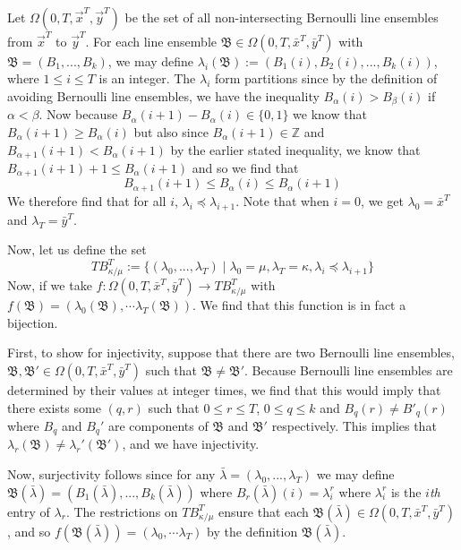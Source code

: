 \documentclass[12pt]{article}
\begin{document}
	Let $\Omega(0,T,\vec{x}^T, \vec{y}^T)$ be the set of all non-intersecting Bernoulli line ensembles from $\vec{x}^T$ to $\vec{y}^T$. For each line ensemble $\mathfrak{B}\in \Omega(0,T,\bar x^T,\bar y^T)$ with $\mathfrak B=(B_1,...,B_k)$, we may define $\lambda_i(\mathfrak B):=(B_1(i),B_2(i),...,B_k(i))$, where $1 \leqslant i\leqslant T$ is an integer. The $\lambda_i$ form partitions since by the definition of avoiding Bernoulli line ensembles, we have the inequality $B_\alpha(i)>B_\beta(i)$ if $\alpha<\beta$. 
Now because $B_\alpha(i+1)-B_\alpha(i)\in \{0,1\}$ we know that $B_\alpha(i+1)\geq B_\alpha(i)$ but also since $B_\alpha(i+1)\in \mathbb{Z}$ and $B_{\alpha+1}(i+1)<B_\alpha(i+1)$ by the earlier stated inequality, we know that $B_{\alpha+1}(i+1)+1\leq B_\alpha(i+1)$ and so we find that 
\[B_{\alpha+1}(i+1)\leq B_\alpha(i)\leq B_\alpha(i+1)\]
We therefore find that for all $i$, $\lambda_i\preceq \lambda_{i+1}$. Note that when $i=0$, we get $\lambda_0=\bar x^T$ and $\lambda_T=\bar y^T$.

Now, let us define the set 
\[TB_{\kappa/\mu}^T:=\{(\lambda_0,...,\lambda_T)\mid \lambda_0=\mu, \lambda_T=\kappa, \lambda_i\preceq\lambda_{i+1}\}\] 
Now, if we take $f:\Omega(0,T,\bar x^T, \bar y ^T)\to TB_{\kappa/\mu}^T$ with $f(\mathfrak{B})= (\lambda_0(\mathfrak{B}),\cdots \lambda_T(\mathfrak{B}))$. We find that this function is in fact a bijection. 

First, to show for injectivity, suppose that there are two Bernoulli line ensembles, $\mathfrak{B}, \mathfrak{B}'\in \Omega(0,T,\bar x^T, \bar y ^T)$ such that $\mathfrak{B}\neq \mathfrak{B'}$.
Because Bernoulli line ensembles are determined by their values at integer times, we find that this would imply that there exists some $(q,r)$ such that $0\leq r\leq T$, $0\leq q \leq k$ and $B_q(r)\neq B'_q(r)$ where $B_q$ and $B_q'$ are components of $\mathfrak{B}$ and $\mathfrak{B'}$ respectively. 
This implies that $\lambda_r(\mathfrak B)\neq \lambda_r'(\mathfrak{B'})$, and we have injectivity. 

Now, surjectivity follows since for any $\bar\lambda=(\lambda_0,...,\lambda_T)$ we may define $\mathfrak{B}(\bar{\lambda})=(B_1(\bar\lambda),...,B_k(\bar\lambda))$ where $B_r(\bar\lambda)(i)=\lambda_i^r$ where $\lambda_i^r$ is the $i$\textit{th} entry of $\lambda_r$. The restrictions on $TB_{\kappa/\mu}^T$ ensure that each $\mathfrak{B}(\bar\lambda)\in \Omega(0,T,\bar x^T,\bar y^T)$, and so $f(\mathfrak B(\bar{\lambda}))=(\lambda_0,\cdots \lambda_T)$ by the definition $\mathfrak{B}(\bar\lambda)$. 
\end{document}
